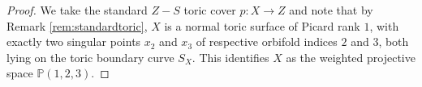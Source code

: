 \documentclass{amsart}
\newcommand{\pp}{\mathbb{P}}
\theoremstyle{definition}
\theoremstyle{remark}
\numberwithin{equation}{section}
\begin{document}
\begin{proof}
We take the standard $Z-S$ toric cover $p:X\to Z$ and note that by Remark \ref{rem:standardtoric}, $X$ is a normal toric surface of Picard rank $1$, with exactly two singular points $x_2$ and $x_3$ of respective orbifold indices $2$ and $3$, both lying on the toric boundary curve $S_X$. This identifies $X$ as the weighted projective space $\pp(1,2,3)$. %


\end{proof}
\end{document}
